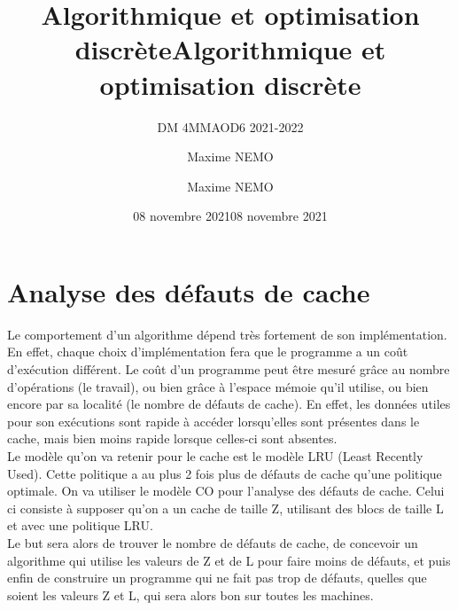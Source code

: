 \documentclass[
  paper=a4,
  ,captions=tableheading
]{scrartcl}
\title{Algorithmique et optimisation discrète}
\subtitle{DM 4MMAOD6 2021-2022}
\author{Maxime NEMO}
\date{08 novembre 2021}
\title{Algorithmique et optimisation discrète}
\author{Maxime NEMO}
\date{08 novembre 2021}
\begin{document}
\begin{titlepage}
\newcommand{\colorRule}[3][black]{\textcolor[HTML]{#1}{\rule{#2}{#3}}}
\end{titlepage}
\restoregeometry




{
\setcounter{tocdepth}{2}
\tableofcontents
\newpage
}
\hypertarget{analyse-des-duxe9fauts-de-cache}{%
\section{Analyse des défauts de
cache}\label{analyse-des-duxe9fauts-de-cache}}

Le comportement d'un algorithme dépend très fortement de son
implémentation. En effet, chaque choix d'implémentation fera que le
programme a un coût d'exécution différent. Le coût d'un programme peut
être mesuré grâce au nombre d'opérations (le travail), ou bien grâce à
l'espace mémoie qu'il utilise, ou bien encore par sa localité (le nombre
de défauts de cache). En effet, les données utiles pour son exécutions
sont rapide à accéder lorsqu'elles sont présentes dans le cache, mais
bien moins rapide lorsque celles-ci sont absentes.\\
Le modèle qu'on va retenir pour le cache est le modèle LRU (Least
Recently Used). Cette politique a au plus 2 fois plus de défauts de
cache qu'une politique optimale. On va utiliser le modèle CO pour
l'analyse des défauts de cache. Celui ci consiste à supposer qu'on a un
cache de taille Z, utilisant des blocs de taille L et avec une politique
LRU.\\
Le but sera alors de trouver le nombre de défauts de cache, de concevoir
un algorithme qui utilise les valeurs de Z et de L pour faire moins de
défauts, et puis enfin de construire un programme qui ne fait pas trop
de défauts, quelles que soient les valeurs Z et L, qui sera alors bon
sur toutes les machines.\\
\hspace*{0.333em}
\end{document}

